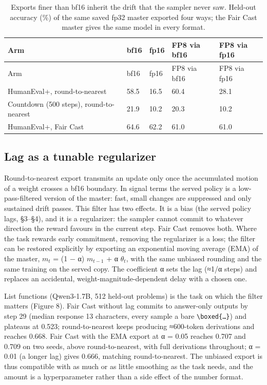 \documentclass[
  10pt,
]{article}
\begin{document}
\begin{longtable}[]{@{}lllll@{}}
\caption{Exports finer than bf16 inherit the drift that the sampler never saw. Held-out accuracy
(\%) of the same saved fp32 master exported four ways; the Fair Cast master gives the same model in
every format.}\tabularnewline
\toprule\noalign{}
Arm & bf16 & fp16 & FP8 via bf16 & FP8 via fp16 \\
\midrule\noalign{}
\endfirsthead
\toprule\noalign{}
Arm & bf16 & fp16 & FP8 via bf16 & FP8 via fp16 \\
\midrule\noalign{}
\endhead
\bottomrule\noalign{}
\endlastfoot
HumanEval+, round-to-nearest & 58.5 & 16.5 & 60.4 & 28.1 \\
Countdown (500 steps), round-to-nearest & 21.9 & 10.2 & 20.3 & 10.2 \\
HumanEval+, Fair Cast & 64.6 & 62.2 & 61.0 & 61.0 \\
\end{longtable}

\subsection{Lag as a tunable regularizer}\label{lag-as-a-tunable-regularizer}

Round-to-nearest export transmits an update only once the accumulated motion of a weight crosses a
bf16 boundary. In signal terms the served policy is a low-pass-filtered version of the master: fast,
small changes are suppressed and only sustained drift passes. This filter has two effects. It is a
bias (the served policy lags, §3--§4), and it is a regularizer: the sampler cannot commit to
whatever direction the reward favours in the current step. Fair Cast removes both. Where the task
rewards early commitment, removing the regularizer is a loss; the filter can be restored explicitly
by exporting an exponential moving average (EMA) of the master, \(m_t\) = (1 − α) \(m_{t- 1}\) + α
\(\theta_t\), with the same unbiased rounding and the same training on the served copy. The
coefficient α sets the lag (≈1/α steps) and replaces an accidental, weight-magnitude-dependent delay
with a chosen one.

List functions (Qwen3-1.7B, 512 held-out problems) is the task on which the filter matters (Figure
8). Fair Cast without lag commits to answer-only outputs by step 29 (median response 13 characters,
every sample a bare \texttt{\textbackslash{}boxed\{…\}}) and plateaus at 0.523; round-to-nearest
keeps producing ≈600-token derivations and reaches 0.668. Fair Cast with the EMA export at α = 0.05
reaches 0.707 and 0.709 on two seeds, above round-to-nearest, with full derivations throughout; α =
0.01 (a longer lag) gives 0.666, matching round-to-nearest. The unbiased export is thus compatible
with as much or as little smoothing as the task needs, and the amount is a hyperparameter rather
than a side effect of the number format.
\end{document}
